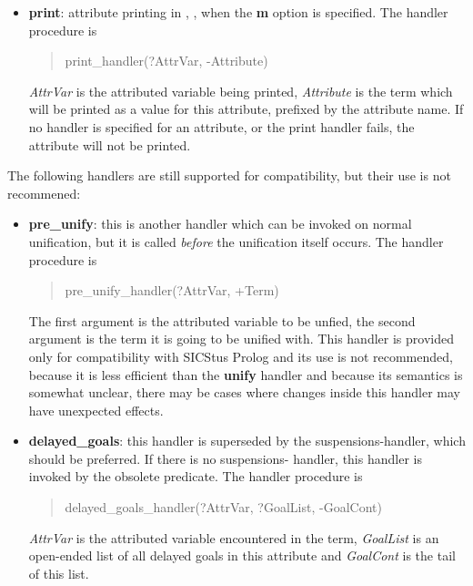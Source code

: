 \begin{itemize}
\item {\bf print}: attribute printing in
,
,
when the {\bf m} option is specified.
The handler procedure is
\begin{quote}
print_handler(?AttrVar, -Attribute)
\end{quote}
{\it AttrVar} is the attributed variable being printed, {\it Attribute}
is the term which will be printed as a value for this attribute,
prefixed by the attribute name.
If no handler is specified for an attribute, or the print handler fails, 
the attribute will not be printed.

\end{itemize}

The following handlers are still supported for compatibility,
but their use is not recommened:
\begin{itemize}
\item {\bf pre_unify}: this is another handler which can be invoked on
normal unification, but it is called {\it before} the unification
itself occurs.
The handler procedure is
\begin{quote}
pre_unify_handler(?AttrVar, +Term)
\end{quote}
The first argument is the attributed variable to be unfied,
the second argument is the term it is going to be unified with.
This handler is provided only for compatibility with SICStus Prolog
and its use is not recommended, because it is less efficient
than the {\bf unify} handler and because its semantics is somewhat
unclear, there may be cases where changes inside this handler
may have unexpected effects.

\item {\bf delayed_goals}: this handler is superseded by the
suspensions-handler, which should be preferred. If there is no suspensions-
handler, this handler is invoked by the obsolete
 predicate.
The handler procedure is
\begin{quote}
delayed_goals_handler(?AttrVar, ?GoalList, -GoalCont)
\end{quote}
{\it AttrVar} is the attributed variable encountered in the
term, {\it GoalList} is an open-ended list of all delayed
goals in this attribute and {\it GoalCont} is the
tail of this list.

\end{itemize}

